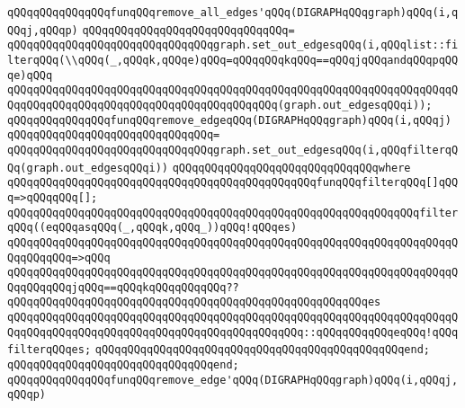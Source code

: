 \newline
\newline
\verb|qQQqqQQqqQQqqQQqfunqQQqremove_all_edges'qQQq(DIGRAPHqQQqgraph)qQQq(i,qQQqj,qQQqp)|\newline
\verb|qQQqqQQqqQQqqQQqqQQqqQQqqQQqqQQq=|\newline
\verb|qQQqqQQqqQQqqQQqqQQqqQQqqQQqqQQqgraph.set_out_edgesqQQq(i,qQQqlist::filterqQQq(\\qQQq(_,qQQqk,qQQqe)qQQq=qQQqqQQqkqQQq==qQQqjqQQqandqQQqpqQQqe)qQQq|\newline
\verb|qQQqqQQqqQQqqQQqqQQqqQQqqQQqqQQqqQQqqQQqqQQqqQQqqQQqqQQqqQQqqQQqqQQqqQQqqQQqqQQqqQQqqQQqqQQqqQQqqQQqqQQqqQQqqQQq(graph.out_edgesqQQqi));|\newline
\newline
\newline
\verb|qQQqqQQqqQQqqQQqfunqQQqremove_edgeqQQq(DIGRAPHqQQqgraph)qQQq(i,qQQqj)|\newline
\verb|qQQqqQQqqQQqqQQqqQQqqQQqqQQqqQQq=|\newline
\verb|qQQqqQQqqQQqqQQqqQQqqQQqqQQqqQQqgraph.set_out_edgesqQQq(i,qQQqfilterqQQq(graph.out_edgesqQQqi))|\newline
\verb|qQQqqQQqqQQqqQQqqQQqqQQqqQQqqQQqwhere|\newline
\verb|qQQqqQQqqQQqqQQqqQQqqQQqqQQqqQQqqQQqqQQqqQQqqQQqfunqQQqfilterqQQq[]qQQq=>qQQqqQQq[];|\newline
\newline
\verb|qQQqqQQqqQQqqQQqqQQqqQQqqQQqqQQqqQQqqQQqqQQqqQQqqQQqqQQqqQQqqQQqfilterqQQq((eqQQqasqQQq(_,qQQqk,qQQq_))qQQq!qQQqes)|\newline
\verb|qQQqqQQqqQQqqQQqqQQqqQQqqQQqqQQqqQQqqQQqqQQqqQQqqQQqqQQqqQQqqQQqqQQqqQQqqQQqqQQq=>qQQq|\newline
\verb|qQQqqQQqqQQqqQQqqQQqqQQqqQQqqQQqqQQqqQQqqQQqqQQqqQQqqQQqqQQqqQQqqQQqqQQqqQQqqQQqjqQQq==qQQqkqQQqqQQqqQQq??qQQqqQQqqQQqqQQqqQQqqQQqqQQqqQQqqQQqqQQqqQQqqQQqqQQqqQQqes|\newline
\verb|qQQqqQQqqQQqqQQqqQQqqQQqqQQqqQQqqQQqqQQqqQQqqQQqqQQqqQQqqQQqqQQqqQQqqQQqqQQqqQQqqQQqqQQqqQQqqQQqqQQqqQQqqQQqqQQqqQQq::qQQqqQQqqQQqeqQQq!qQQqfilterqQQqes;|\newline
\verb|qQQqqQQqqQQqqQQqqQQqqQQqqQQqqQQqqQQqqQQqqQQqqQQqend;|\newline
\verb|qQQqqQQqqQQqqQQqqQQqqQQqqQQqqQQqend;|\newline
\newline
\newline
\verb|qQQqqQQqqQQqqQQqfunqQQqremove_edge'qQQq(DIGRAPHqQQqgraph)qQQq(i,qQQqj,qQQqp)|\newline
